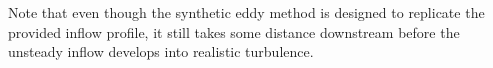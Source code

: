 
Note that even though the synthetic eddy method is designed to
replicate the provided inflow profile, it still takes some distance
downstream before the unsteady inflow develops into realistic turbulence.


%
